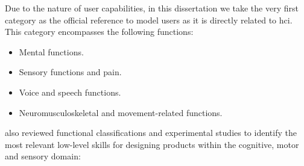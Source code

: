 %     
% 
% 
% 
% 
% 







Due to the nature of user capabilities, in this dissertation we take the very 
first category as the official reference to model users as it is directly 
related to \ac{hci}. This category encompasses the following functions:

\begin{itemize}
  \item Mental functions.
  \item Sensory functions and pain.
  \item Voice and speech functions.
  \item Neuromusculoskeletal and movement-related functions.
\end{itemize}


\citeauthor{persad_cognitive_2007} also reviewed functional classifications 
and experimental studies to identify the most relevant low-level skills for 
designing products within the cognitive, motor and sensory domain:

